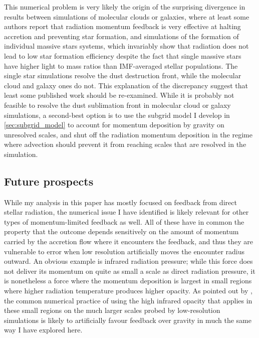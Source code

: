 \documentclass[useAMS,usenatbib]{mn2e}
\begin{document}
This numerical problem is very likely the origin of the surprising divergence in results between simulations of molecular clouds or galaxies, where at least some authors report that radiation momentum feedback is very effective at halting accretion and preventing star formation, and simulations of the formation of individual massive stars systems, which invariably show that radiation does not lead to low star formation efficiency despite the fact that single massive stars have higher light to mass ratios than IMF-averaged stellar populations. The single star simulations resolve the dust destruction front, while the molecular cloud and galaxy ones do not. This explanation of the discrepancy suggest that least some published work should be re-examined. While it is probably not feasible to resolve the dust sublimation front in molecular cloud or galaxy simulations, a second-best option is to use the subgrid model I develop in \autoref{sec:subgrid_model} to account for momentum deposition by gravity on unresolved scales, and shut off the radiation momentum deposition in the regime where advection should prevent it from reaching scales that are resolved in the simulation.

\subsection{Future prospects}

While my analysis in this paper has mostly focused on feedback from direct stellar radiation, the numerical issue I have identified is likely relevant for other types of momentum-limited feedback as well. All of these have in common the property that the outcome depends sensitively on the amount of momentum carried by the accretion flow where it encounters the feedback, and thus they are vulnerable to error when low resolution artificially moves the encounter radius outward. An obvious example is infrared radiation pressure; while this force does not deliver its momentum on quite as small a scale as direct radiation pressure, it is nonetheless a force where the momentum deposition is largest in small regions where higher radiation temperature produces higher opacity. As pointed out by \citet{crocker18a}, the common numerical practice of using the high infrared opacity that applies in these small regions on the much larger scales probed by low-resolution simulations is likely to artificially favour feedback over gravity in much the same way I have explored here.
\end{document}
